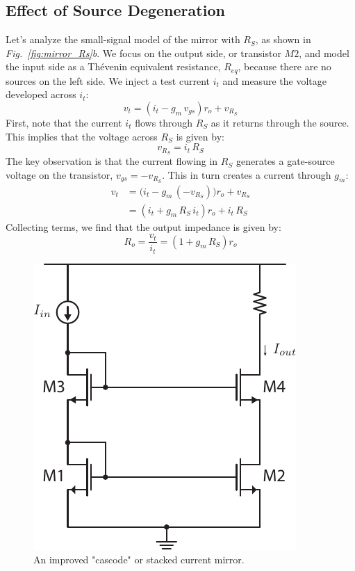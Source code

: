 \subsection{Effect of Source Degeneration}
Let's analyze the small-signal model of the mirror with $R_S$, as shown in \emph{Fig.~\ref{fig:mirror_Rs}b}.  We focus on the output side, or transistor $M2$, and model the input side as a Thévenin equivalent resistance, $R_{eq}$, because there are no sources on the left side.  We inject a test current $i_t$ and measure the voltage developed across $i_t$:
    \begin{equation}
        v_t = (i_t - g_m\,v_{gs})r_o + v_{R_S}
    \end{equation}
First, note that the current $i_t$ flows through $R_S$ as it returns through the source.  This implies that the voltage across $R_S$ is given by:
    \begin{equation}
        v_{R_S} = i_t\,R_S
    \end{equation}
The key observation is that the current flowing in $R_S$ generates a gate-source voltage on the transistor, $v_{gs} = -v_{R_S}$.  This in turn creates a current through $g_m$:
    \begin{align}
        v_t &= \big(i_t - g_m\,(-v_{R_S})\big)r_o + v_{R_S}\\[0.25cm]
        &= (i_t + g_m\,R_S\,i_t)r_o + i_t\,R_S
    \end{align}
Collecting terms, we find that the output impedance is given by:
    \begin{equation}
        R_o = \frac{v_t}{i_t} = \left(1 + g_m\,R_S\right)r_o
    \end{equation}
\newpage
\begin{figure}[t]
\centering
\includegraphics[scale=1]{12mirror_cascode.pdf}
\caption{An improved "cascode" or stacked current mirror.}
\label{fig:mirror_cascode}
\end{figure}
